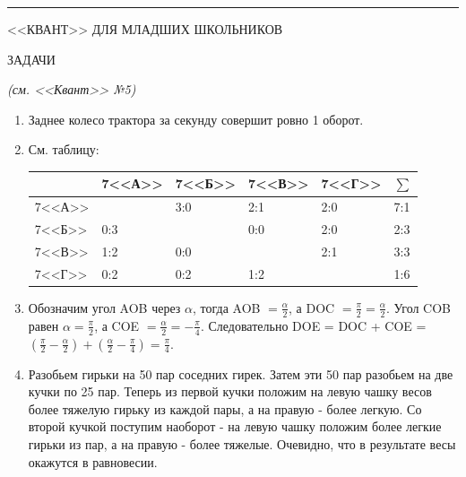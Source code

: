 

\rule{\textwidth}{1 pt}
\medskip
{\textsc{\large<<КВАНТ>> ДЛЯ МЛАДШИХ ШКОЛЬНИКОВ}

\par \medskip  ЗАДАЧИ}

{\it (см. <<Квант>> №5)}

\begin{enumerate}[itemsep = -3pt, itemindent = -7pt, labelsep = 5pt, font = \bfseries, topsep = 3pt, wide]
    \item Заднее колесо трактора за секунду совершит ровно 1 оборот.
    \item См. таблицу:
\begin{table}[h]
\centering
    \begin{tabular}{|m{4ex}|m{4ex}|m{4ex}|m{4ex}|m{4ex}| m{4ex}|}
    \hline
         \cellcolor{lightgray} & 7<<А>> & 7<<Б>> & 7<<В>> & 7<<Г>> & $\sum$ \\
         \hline
        7<<А>> & \cellcolor{lightgray} & 3:0 & 2:1 & 2:0 & 7:1 \\ 
        \hline
        7<<Б>> & 0:3 & \cellcolor{lightgray} & 0:0 & 2:0 & 2:3 \\ 
        \hline
        7<<В>> & 1:2 & 0:0 & \cellcolor{lightgray} & 2:1 & 3:3 \\ 
        \hline
        7<<Г>> & 0:2 & 0:2 & 1:2 & \cellcolor{lightgray} & 1:6 \\ 
        \hline
    \end{tabular}
\end{table}
    \item Обозначим угол AOB через $\alpha$, тогда \angle AOB $= \frac{\alpha}{2}$, а \angle DOC $= \frac{\pi}{2} = \frac{\alpha}{2}$. Угол COB равен  $\alpha = \frac{\pi}{2}$, а \angle COE $= \frac{\alpha}{2} = -\frac{\pi}{4}$.  Следовательно \angle DOE = \angle DOC + \angle COE = $\left(\frac{\pi}{2} - \frac{\alpha}{2}\right) + \left(\frac{\alpha}{2} - \frac{\pi}{4}\right) = \frac{\pi}{4}$.
    \medskip
    \item Разобьем гирьки на 50 пар соседних гирек. Затем эти 50 пар разобьем на две кучки по 25 пар. Теперь из первой кучки положим на левую чашку весов более тяжелую гирьку из каждой пары, а на правую - более легкую. Со второй кучкой поступим наоборот - на левую чашку положим более легкие гирьки из пар, а на правую - более тяжелые. Очевидно, что в результате весы окажутся в равновесии.

\end{enumerate}
